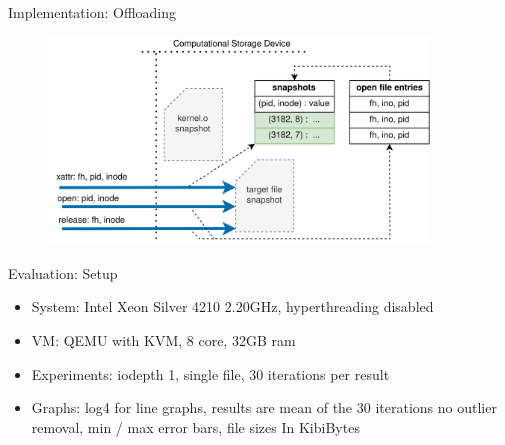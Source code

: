 \documentclass{beamer}
\begin{document}
\begin{frame}{Implementation: Offloading}
	\begingroup
	\small 
	\begin{figure}
		\centering
		\includegraphics[width=0.9\textwidth]{resources/images/offloading-management.png}
	\end{figure}
	\endgroup
\end{frame}

\begin{frame}{Evaluation: Setup}
	\begingroup
	\small
	\begin{itemize}
		\item System: Intel Xeon Silver 4210 2.20GHz, hyperthreading disabled
		\item VM: QEMU with KVM, 8 core, 32GB ram
		\item Experiments: iodepth 1, single file, 30 iterations per result
		\item Graphs: log4 for line graphs, results are mean of the 30 iterations
		no outlier removal, min / max error bars, file sizes In KibiBytes
	\end{itemize}
	\endgroup
\end{frame}
\end{document}
